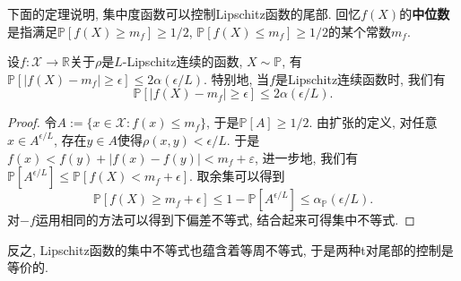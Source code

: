 下面的定理说明, 集中度函数可以控制Lipschitz函数的尾部. 
回忆$f(X)$的\textbf{中位数}是指满足$\mathbb{P}[f(X) \geq m_f] \geq 1/2$, $\mathbb{P}[f(X) \leq m_f] \geq 1/2$的某个常数$m_f$. 

\begin{theorem}[Lévy不等式]
	设$f \colon \mathcal{X} \to \mathbb{R}$关于$\rho$是$L$-Lipschitz连续的函数, $X \sim \mathbb{P}$, 有$\mathbb{P}[ |f(X) - m_f| \geq \epsilon] \leq 2 \alpha(\epsilon / L)$. 
	特别地, 当$f$是Lipschitz连续函数时, 我们有
	\begin{equation*}
		\mathbb{P}[ |f(X) - m_f| \geq \epsilon] \leq 2 \alpha(\epsilon / L). 
	\end{equation*}
\end{theorem}
\begin{proof}
	令$A := \{x \in \mathcal{X} \colon f(x) \leq m_f\}$, 于是$\mathbb{P}[A] \geq 1/2$. 
	由扩张的定义, 对任意$x \in A^{\epsilon / L}$, 存在$y \in A$使得$\rho(x,y) < \epsilon / L$. 
	于是$f(x) < f(y) + |f(x) - f(y)| < m_f + \varepsilon$, 进一步地, 我们有$\mathbb{P}[A^{\epsilon / L}] \leq \mathbb{P}[f(X) < m_f + \epsilon]$. 
	取余集可以得到
	\begin{equation*}
		\mathbb{P}[f(X) \geq m_f + \epsilon] 
		\leq 1 - \mathbb{P}[A^{\epsilon / L}] 
		\leq \alpha_{\mathbb{P}}(\epsilon / L). 
	\end{equation*}
	对$-f$运用相同的方法可以得到下偏差不等式, 结合起来可得集中不等式. 
\end{proof}

反之, Lipschitz函数的集中不等式也蕴含着等周不等式, 于是两种t对尾部的控制是等价的. 

